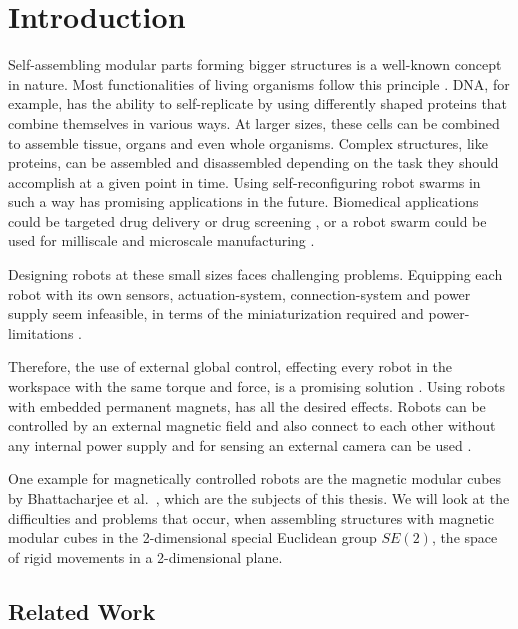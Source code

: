 \chapter{Introduction}
\label{chap:intro}

Self-assembling modular parts forming bigger structures is a well-known concept in nature.
Most functionalities of living organisms follow this principle \cite{bishop2005}.
DNA, for example, has the ability to self-replicate by using differently shaped proteins that combine themselves in various ways.
At larger sizes, these cells can be combined to assemble tissue, organs and even whole organisms.
Complex structures, like proteins, can be assembled and disassembled depending on the task they should accomplish at a given point in time. 
Using self-reconfiguring robot swarms in such a way has promising applications in the future.
Biomedical applications could be targeted drug delivery or drug screening \cite{sitti2015}, or a robot swarm could be used for milliscale and microscale manufacturing \cite{pelrine2016}.

Designing robots at these small sizes faces challenging problems.
Equipping each robot with its own sensors, actuation-system, connection-system and power supply seem infeasible, in terms of the miniaturization required and power-limitations \cite{white2007}.

Therefore, the use of external global control, effecting every robot in the workspace with the same torque and force, is a promising solution \cite{white2007}.
Using robots with embedded permanent magnets, has all the desired effects.
Robots can be controlled by an external magnetic field and also connect to each other without any internal power supply and for sensing an external camera can be used \cite{saab2019}.

One example for magnetically controlled robots are the magnetic modular cubes by Bhattacharjee et al.\ \cite{Bhattacharjee2022}, which are the subjects of this thesis.
We will look at the difficulties and problems that occur, when assembling structures with magnetic modular cubes in the 2-dimensional special Euclidean group $\textit{SE}(2)$, the space of rigid movements in a 2-dimensional plane.



\section{Related Work}

